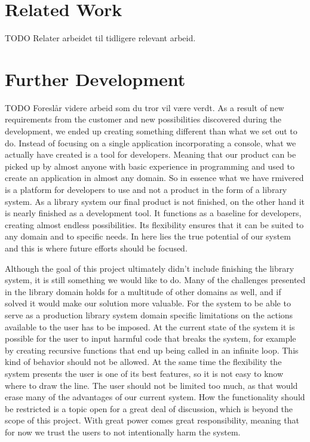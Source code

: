 \section{Related Work}
TODO
Relater arbeidet til tidligere relevant arbeid.


\section{Further Development}
TODO
Foreslår videre arbeid som du tror vil være verdt.
As a result of new requirements from the customer and new possibilities discovered during the development, we ended up creating something different than what we set out to do. Instead of focusing on a single application incorporating a console, what we actually have created is a tool for developers. Meaning that our product can be picked up by almost anyone with basic experience in programming and used to create an application in almost any domain. So in essence what we have rmivered is a platform for developers to use and not a product in the form of a library system. As a library system our final product is not finished, on the other hand it is nearly finished as a development tool. It functions as a baseline for developers, creating almost endless possibilities. Its flexibility ensures that it can be suited to any domain and to specific needs. In here lies the true potential of our system and this is where future efforts should be focused.

Although the goal of this project ultimately didn’t include finishing the library system, it is still something we would like to do. Many of the challenges presented in the library domain holds for a multitude of other domains as well, and if solved it would make our solution more valuable. For the system to be able to serve as a production library system domain specific limitations on the actions available to the user has to be imposed. At the current state of the system it is possible for the user to input harmful code that breaks the system, for example by creating recursive functions that end up being called in an infinite loop. This kind of behavior should not be allowed. At the same time the flexibility the system presents the user is one of its best features, so it is not easy to know where to draw the line. The user should not be limited too much, as that would erase many of the advantages of our current system. How the functionality should be restricted is a topic open for a great deal of discussion, which is beyond the scope of this project. With great power comes great responsibility, meaning that for now we trust the users to not intentionally harm the system.

